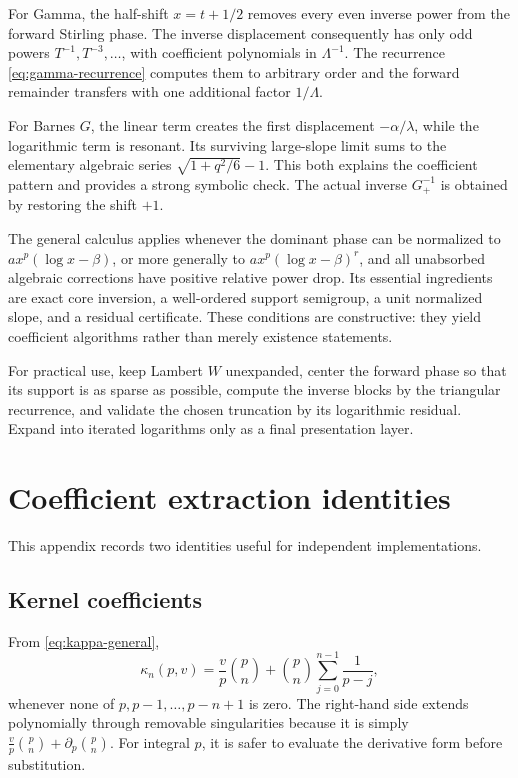 \documentclass[11pt,oneside]{article}
\theoremstyle{plain}
\theoremstyle{definition}
\theoremstyle{remark}
\begin{document}
For Gamma, the half-shift \(x=t+1/2\) removes every even inverse power from the
forward Stirling phase.  The inverse displacement consequently has only odd
powers \(T^{-1},T^{-3},\ldots\), with coefficient polynomials in
\(\Lambda^{-1}\).  The recurrence \cref{eq:gamma-recurrence} computes them to
arbitrary order and the forward remainder transfers with one additional
factor \(1/\Lambda\).

For Barnes \(G\), the linear term creates the first displacement
\(-\alpha/\lambda\), while the logarithmic term is resonant.  Its surviving
large-slope limit sums to the elementary algebraic series
\(\sqrt{1+q^2/6}-1\).  This both explains the coefficient pattern and provides
a strong symbolic check.  The actual inverse \(G_+^{-1}\) is obtained by
restoring the shift \(+1\).

The general calculus applies whenever the dominant phase can be normalized to
\(a x^p(\log x-\beta)\), or more generally to
\(a x^p(\log x-\beta)^r\), and all unabsorbed algebraic corrections have
positive relative power drop.  Its essential ingredients are exact core
inversion, a well-ordered support semigroup, a unit normalized slope, and a
residual certificate.  These conditions are constructive: they yield
coefficient algorithms rather than merely existence statements.

\begin{summarybox}
For practical use, keep Lambert \(W\) unexpanded, center the forward phase so
that its support is as sparse as possible, compute the inverse blocks by the
triangular recurrence, and validate the chosen truncation by its logarithmic
residual.  Expand into iterated logarithms only as a final presentation layer.
\end{summarybox}

\appendix

\section{Coefficient extraction identities}
\label{app:coefficient-extraction}

This appendix records two identities useful for independent implementations.

\subsection{Kernel coefficients}

From \cref{eq:kappa-general},
\begin{equation}
 \kappa_n(p,v)=\frac{v}{p}\binom pn+
 \binom pn\sum_{j=0}^{n-1}\frac{1}{p-j},
 \label{eq:kappa-harmonic-form}
\end{equation}
whenever none of \(p,p-1,\ldots,p-n+1\) is zero.  The right-hand side extends
polynomially through removable singularities because it is simply
\(\frac{v}{p}\binom pn+\partial_p\binom pn\).  For integral \(p\), it is safer
to evaluate the derivative form before substitution.
\end{document}
